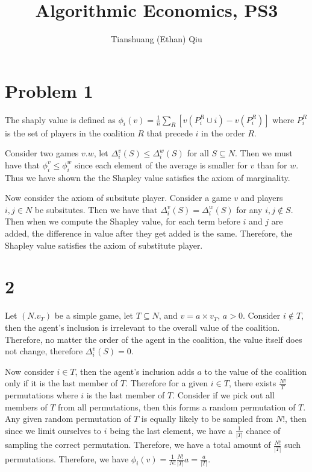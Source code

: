 \documentclass[12pt]{article}
\author{Tianshuang (Ethan) Qiu}
\begin{document}
\title{Algorithmic Economics, PS3}
\maketitle

\section*{Problem 1}
The shaply value is defined as $\phi_i(v) = \frac{1}{n}\sum_R[v(P_i^R \cup {i})-v(P_i^R)]$
where $P_i^R$ is the set of players in the coalition $R$ that precede $i$ in the order $R$.

Consider two games $v. w$, let $\Delta_i^v(S) \leq \Delta_i^w(S)$ for all $S \subseteq N$. Then we must have 
that $\phi_i^v \leq \phi_i^w$ since each element of the average is smaller for $v$ than for $w$.
Thus we have shown the the Shapley value satisfies the axiom of marginality.

Now consider the axiom of subsitute player. Consider a game $v$ and players $i, j \in N$ be subsitutes. Then we have 
that $\Delta_i^v(S) = \Delta_i^w(S)$ for any $i, j \not\in S$. Then when we compute the Shapley value, 
for each term before $i$ and $j$ are added, the difference in value after they get added is the same. 
Therefore, the Shapley value satisfies the axiom of substitute player.

\newpage
\section*{2}
Let $(N. v_T)$ be a simple game, let $T \subseteq N$, and $v=a\times v_T$, $a > 0$.
Consider $i \not \in T$, then the agent's inclusion is irrelevant to the overall value of the coalition.
Therefore, no matter the order of the agent in the coalition, the value itself does not change, therefore 
$\Delta_i^v(S) = 0$.

Now consider $i \in T$, then the agent's inclusion adds $a$ to the value of the coalition only if it is the last member of $T$. Therefore 
for a given $i \in T$, there exists $\frac{N!}{T}$ permutations where $i$ is the last member of $T$. Consider if we pick out all members of $T$ from all 
permutations, then this forms a random permutation of $T$. Any given random permutation of $T$ is equally likely to be sampled from $N!$, then since we limit 
ourselves to $i$ being the last element, we have a $\frac{1}{|T|}$ chance of sampling the correct permutation. Therefore, we have a total amount of 
$\frac{N!}{|T|}$ such permutations. Therefore, we have $\phi_i(v) = \frac{1}{N!}\frac{N!}{|T|}a = \frac{a}{|T|}$.
\end{document}
